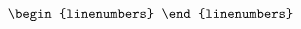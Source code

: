 \documentclass[10pt]{article}
\begin{document}
\[\begin{linenumbers}




\end{linenumbers}\]
\end{document}
